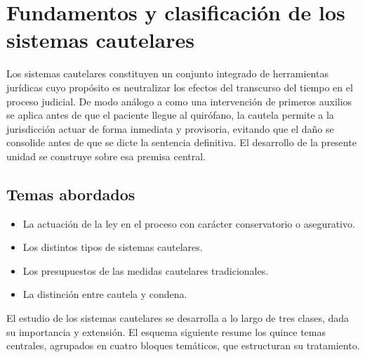 \documentclass[12pt,oneside]{book}
\begin{document}
\tableofcontents

\chapter{Fundamentos y clasificación de los sistemas cautelares}

Los sistemas cautelares constituyen un conjunto integrado de herramientas jurídicas cuyo propósito es neutralizar los efectos del transcurso del tiempo en el proceso judicial. De modo análogo a como una intervención de primeros auxilios se aplica antes de que el paciente llegue al quirófano, la cautela permite a la jurisdicción actuar de forma inmediata y provisoria, evitando que el daño se consolide antes de que se dicte la sentencia definitiva. El desarrollo de la presente unidad se construye sobre esa premisa central.

\section*{Temas abordados}
\begin{itemize}
    \item La actuación de la ley en el proceso con carácter conservatorio o asegurativo.
    \item Los distintos tipos de sistemas cautelares.
    \item Los presupuestos de las medidas cautelares tradicionales.
    \item La distinción entre cautela y condena.
\end{itemize}

\begin{note}
El estudio de los sistemas cautelares se desarrolla a lo largo de tres clases, dada su importancia y extensión. El esquema siguiente resume los quince temas centrales, agrupados en cuatro bloques temáticos, que estructuran su tratamiento.
\end{note}
\end{document}
